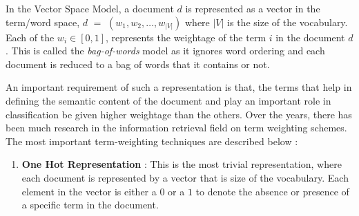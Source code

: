 In the Vector Space Model, a document $d$ is represented as a vector in the term/word space, $d$ $=$ $(w_{1}, w_{2}, \ldots, w_{|V|})$ where $|V|$ is the size of the vocabulary. Each of the $w_{i} \in \left[0,1\right]$, represents the weightage of the term $i$ in the document $d$. This is called the \emph{bag-of-words} model as it ignores word ordering and each document is reduced to a bag of words that it contains or not. 

An important requirement of such a representation is that, the terms that help in defining the semantic content of the document and play an important role in classification be given higher weightage than the others. Over the years, there has been much research in the information retrieval field on term weighting schemes. The most important term-weighting techniques are described below : 
\begin{enumerate}
\item{\textbf{One Hot Representation} : }This is the most trivial representation, where each document is represented by a vector that is size of the vocabulary. Each element in the vector is either a $0$ or a $1$ to denote the absence or presence of a specific term in the document.


\end{enumerate}
